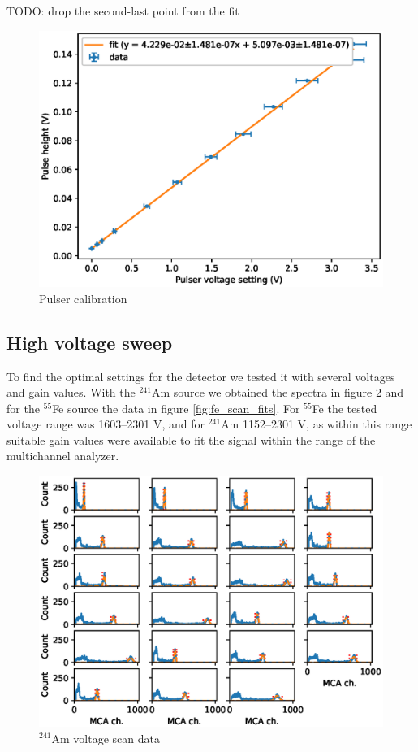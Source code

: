 \documentclass[a4paper]{article}
\begin{document}
TODO: drop the second-last point from the fit

\begin{figure}[ht!]
\centering
\includegraphics[width=\textwidth]{fig/python/pulser_calibration.eps}
\caption{Pulser calibration}
\label{fig:pulser_calibration}
\end{figure}


\clearpage
\subsection{High voltage sweep}
\label{results_hv}
To find the optimal settings for the detector we tested it with several voltages and gain values.
With the $^{241}$Am source we obtained the spectra in figure \ref{fig:am_scan_fits} and for the $^{55}$Fe source the data in figure \ref{fig:fe_scan_fits}.
For $^{55}$Fe the tested voltage range was 1603--2301 V, and for $^{241}$Am 1152--2301 V, as within this range suitable gain values were available to fit the signal within the range of the multichannel analyzer.

\begin{figure}[ht!]
\centering
\includegraphics[width=\textwidth]{fig/python/am_scan_fits.eps}
\caption{$^{241}$Am voltage scan data}
\label{fig:am_scan_fits}
\end{figure}
\end{document}
